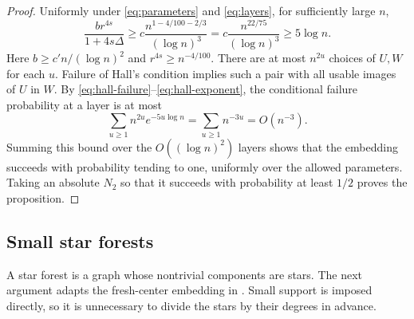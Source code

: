 \documentclass[11pt]{article}
\theoremstyle{remark}
\numberwithin{equation}{section}
\begin{document}
\begin{proof}
Uniformly under \eqref{eq:parameters} and \eqref{eq:layers},
for sufficiently large $n$,
\begin{equation}\label{eq:hall-exponent}
 \frac{b r^{4s}}{1+4s\Delta}
 \geq c\frac{n^{1-4/100-2/3}}{(\log n)^3}
 =c\frac{n^{22/75}}{(\log n)^3}\geq5\log n.
\end{equation}
Here $b\geq c'n/(\log n)^2$ and $r^{4s}\geq n^{-4/100}$.
There are at most $n^{2u}$ choices of $U,W$ for each $u$.
Failure of Hall's condition implies such a pair with all usable
images of $U$ in $W$. By \eqref{eq:hall-failure}--\eqref{eq:hall-exponent},
the conditional failure probability at a layer is at most
\[
 \sum_{u\geq1}n^{2u}e^{-5u\log n}
 =\sum_{u\geq1}n^{-3u}=O(n^{-3}).
\]
Summing this bound over the $O((\log n)^2)$ layers shows that
the embedding succeeds with probability tending to one,
uniformly over the allowed parameters. Taking an absolute
$N_2$ so that it succeeds with probability at least $1/2$
proves the proposition.
\end{proof}

\subsection{Small star forests}

A star forest is a graph whose nontrivial components are stars.
The next argument adapts the fresh-center embedding in
\cite[Claim~6.6]{AHPT26}. Small support is imposed directly,
so it is unnecessary to divide the stars by their degrees in
advance.
\end{document}
